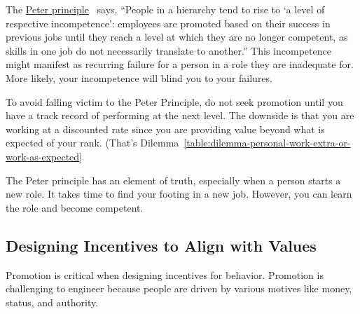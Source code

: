 The \href{https://en.wikipedia.org/wiki/Peter_principle}{Peter principle}~\cite{1970_Peter} says, 
%
%
%
``People in a hierarchy tend to rise to `a level of respective incompetence': employees are promoted based on their success in previous jobs until they reach a level at which they are no longer competent, as skills in one job do not necessarily translate to another.''
This incompetence might manifest as recurring failure for a person in a role they are inadequate for. More likely, your incompetence will blind you to your failures.

To avoid falling victim to the Peter Principle, do not seek promotion until you have a track record of performing at the next level. 
%
%
The downside is that you are working at a discounted rate since you are providing value beyond what is expected of your rank. (That's Dilemma~\ref{table:dilemma-personal-work-extra-or-work-as-expected}\iftoggle{haspagenumbers}{ on page~\pageref{table:dilemma-personal-work-extra-or-work-as-expected}.)}{.)} 


The Peter principle has an element of truth, especially when a person starts a new role. It takes time to find your footing in a new job. However, you can learn the role and become competent. %


\subsection*{Designing Incentives to Align with Values}
Promotion is critical when designing incentives for behavior. Promotion is challenging to engineer because people are driven by various motives like money, status, and authority. 


